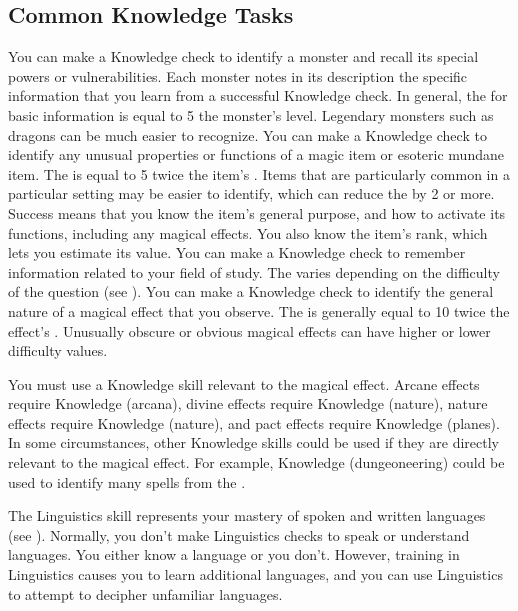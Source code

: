     \subsection{Common Knowledge Tasks}
         You can make a Knowledge check to identify a monster and recall its special powers or vulnerabilities.
        Each monster notes in its description the specific information that you learn from a successful Knowledge check.
        In general, the  for basic information is equal to 5 \add the monster's level.
        Legendary monsters such as dragons can be much easier to recognize.
         You can make a Knowledge check to identify any unusual properties or functions of a magic item or esoteric mundane item.
        The  is equal to 5 \add twice the item's .
        Items that are particularly common in a particular setting may be easier to identify, which can reduce the  by 2 or more.
        Success means that you know the item's general purpose, and how to activate its functions, including any magical effects.
        You also know the item's rank, which lets you estimate its value.
         You can make a Knowledge check to remember information related to your field of study.
        The  varies depending on the difficulty of the question (see ).
        \label{Identify Magical Effect} You can make a Knowledge check to identify the general nature of a magical effect that you observe.
        The  is generally equal to 10 \add twice the effect's .
        Unusually obscure or obvious magical effects can have higher or lower difficulty values.

        You must use a Knowledge skill relevant to the magical effect.
        Arcane effects require Knowledge (arcana), divine effects require Knowledge (nature), nature effects require Knowledge (nature), and pact effects require Knowledge (planes).
        In some circumstances, other Knowledge skills could be used if they are directly relevant to the magical effect.
        For example, Knowledge (dungeoneering) could be used to identify many spells from the  .

\newpage
{}
        The Linguistics skill represents your mastery of spoken and written languages (see ).
        Normally, you don't make Linguistics checks to speak or understand languages.
        You either know a language or you don't.
        However, training in Linguistics causes you to learn additional languages, and you can use Linguistics to attempt to decipher unfamiliar languages.

